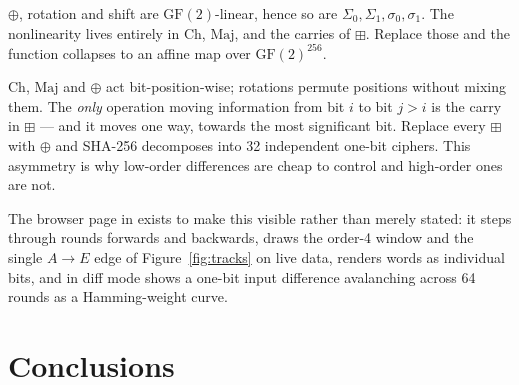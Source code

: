\documentclass[11pt,a4paper]{article}
\begin{document}
\begin{description}[leftmargin=1.4em,style=nextline]
\item[The linear/nonlinear split.] $\oplus$, rotation and shift are
  $\mathrm{GF}(2)$-linear, hence so are $\Sigma_0,\Sigma_1,\sigma_0,\sigma_1$.
  The nonlinearity lives entirely in $\mathrm{Ch}$, $\mathrm{Maj}$, and the
  carries of $\boxplus$. Replace those and the function collapses to an affine
  map over $\mathrm{GF}(2)^{256}$.
\item[Bit-slices are coupled only by carries.] $\mathrm{Ch}$, $\mathrm{Maj}$
  and $\oplus$ act bit-position-wise; rotations permute positions without
  mixing them. The \emph{only} operation moving information from bit $i$ to
  bit $j > i$ is the carry in $\boxplus$ --- and it moves one way, towards the
  most significant bit. Replace every $\boxplus$ with $\oplus$ and SHA-256
  decomposes into 32 independent one-bit ciphers. This asymmetry is why
  low-order differences are cheap to control and high-order ones are not.
\end{description}

The browser page in  exists to make this visible rather
than merely stated: it steps through rounds forwards and backwards, draws the
order-4 window and the single $A\!\rightarrow\!E$ edge of
Figure~\ref{fig:tracks} on live data, renders words as individual bits, and in
diff mode shows a one-bit input difference avalanching across 64 rounds as a
Hamming-weight curve.

\section{Conclusions}
\end{document}
